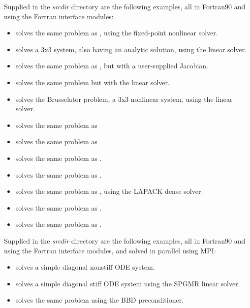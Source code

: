 \vspace{0.2in}\noindent Supplied in the
{\em srcdir} directory are the
following examples, all in Fortran90 and using the {\sundials} Fortran
interface modules:
\begin{itemize}
\item {} solves the same problem as
  , using the fixed-point nonlinear solver.
\item {} solves a 3x3 system, also
  having an analytic solution, using the {\sunlinsoldense} linear solver.
\item {} solves the same problem as
  , but with a user-supplied Jacobian.
\item {} solves the same problem but
  with the {\sunlinsolklu} linear solver.
\item {} solves the Brusselator problem,
  a 3x3 nonlinear system, using the {\sunlinsoldense} linear solver.
\item {} solves the same problem as
\item {} solves the same problem as
\item {} solves the same problem as
  .
\item {} solves the same problem as
  .
\item {} solves the same problem as
  , using the LAPACK dense solver.
\item {} solves the same problem as
  .
\item {} solves the same problem as
  .
\end{itemize}

\vspace{0.2in}\noindent Supplied in the
{\em srcdir} directory are the
following examples, all in Fortran90 and using the {\sundials} Fortran
interface modules, and solved in parallel using MPI:
\begin{itemize}
\item {} solves a simple diagonal nonstiff
  ODE system.
\item {} solves a simple diagonal stiff
  ODE system using the SPGMR linear solver.
\item {} solves the same problem
  using the BBD preconditioner.
\end{itemize}

